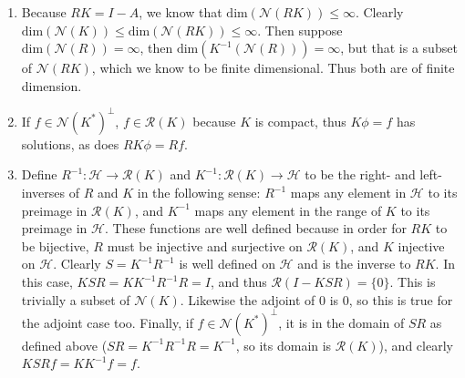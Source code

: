 \documentclass[12pt]{article}
\renewcommand{\dim}{\text{dim}}
\renewcommand{\null}{\mathcal{N}}
\newcommand{\ran}{\mathcal{R}}
\newcommand{\R}{\mathcal{R}}
\renewcommand{\H}{\mathcal{H}}
\begin{document}
\begin{enumerate}[label=\alph*)]
\item Because $RK = I-A$, we know that $\dim(\null(RK)) \leq \infty$. Clearly
  $\dim(\null(K)) \leq \dim(\null(RK)) \leq \infty$. Then suppose $\dim(\null(R))
  = \infty$, then $\dim(K^{-1}(\null(R))) = \infty$, but that is a subset of
  $\null(RK)$, which we know to be finite dimensional. Thus both are of finite
  dimension.
\item If $f \in \null(K^*)^\bot$,  $f \in \ran(K)$ because $K$ is compact, thus
  $K\phi = f$ has solutions, as does $RK\phi = Rf$. 
\item Define $R^{-1}: \mathcal{H} \to \R(K)$ and $K^{-1}: \R(K)\to\mathcal{H}$
  to be the right- and left-inverses of $R$ and $K$ in the following sense:
  $R^{-1}$ maps any element in $\H$ to its preimage in $\R(K)$, and $K^{-1}$
  maps any element in the range of $K$ to its preimage in $\H$. These functions
  are well defined because in order for $RK$ to be bijective, $R$ must be
  injective and surjective on $\R(K)$, and $K$ injective on $\H$. Clearly $S =
  K^{-1}R^{-1}$ is well defined on $\H$ and is the inverse to $RK$. In this case,
  $KSR = KK^{-1}R^{-1}R = I$, and thus $\R(I-KSR) = \{0\}$.
  This is trivially a subset of $\null(K)$. Likewise the adjoint of 0 is 0,
  so this is true for the adjoint case too. Finally, if $f\in\null(K^*)^\bot$, it
  is in the domain of $SR$ as defined above ($SR = K^{-1}R^{-1}R = K^{-1}$, so
  its domain is $\R(K)$), and clearly $KSRf = KK^{-1}f = f$.
\end{enumerate}
\end{document}
